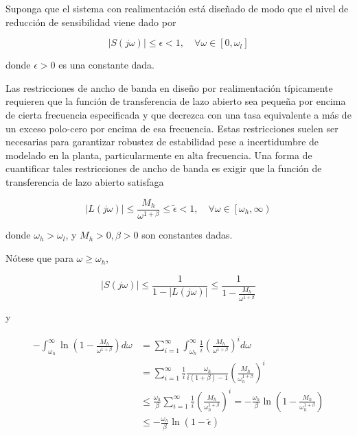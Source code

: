 
Suponga que el sistema con realimentación está diseñado de modo que el nivel de reducción de sensibilidad viene dado por

$$
|S(j \omega)| \leq \epsilon<1, \quad \forall \omega \in\left[0, \omega_{l}\right]
$$

donde $\epsilon>0$ es una constante dada.

Las restricciones de ancho de banda en diseño por realimentación típicamente requieren que la función de transferencia de lazo abierto sea pequeña por encima de cierta frecuencia especificada y que decrezca con una tasa equivalente a más de un exceso polo-cero por encima de esa frecuencia. Estas restricciones suelen ser necesarias para garantizar robustez de estabilidad pese a incertidumbre de modelado en la planta, particularmente en alta frecuencia. Una forma de cuantificar tales restricciones de ancho de banda es exigir que la función de transferencia de lazo abierto satisfaga

$$
|L(j \omega)| \leq \frac{M_{h}}{\omega^{1+\beta}} \leq \tilde{\epsilon}<1, \quad \forall \omega \in\left[\omega_{h}, \infty\right)
$$

donde $\omega_{h}>\omega_{l}$, y $M_{h}>0, \beta>0$ son constantes dadas.

Nótese que para $\omega \geq \omega_{h}$,

$$
|S(j \omega)| \leq \frac{1}{1-|L(j \omega)|} \leq \frac{1}{1-\frac{M_{h}}{\omega^{1+\beta}}}
$$

y

$$
\begin{aligned}
-\int_{\omega_{h}}^{\infty} \ln \left(1-\frac{M_{h}}{\omega^{1+\beta}}\right) d \omega & =\sum_{i=1}^{\infty} \int_{\omega_{h}}^{\infty} \frac{1}{i}\left(\frac{M_{h}}{\omega^{1+\beta}}\right)^{i} d \omega \\
& =\sum_{i=1}^{\infty} \frac{1}{i} \frac{\omega_{h}}{i(1+\beta)-1}\left(\frac{M_{h}}{\omega_{h}^{1+\beta}}\right)^{i} \\
& \leq \frac{\omega_{h}}{\beta} \sum_{i=1}^{\infty} \frac{1}{i}\left(\frac{M_{h}}{\omega_{h}^{1+\beta}}\right)^{i}=-\frac{\omega_{h}}{\beta} \ln \left(1-\frac{M_{h}}{\omega_{h}^{1+\beta}}\right) \\
& \leq-\frac{\omega_{h}}{\beta} \ln (1-\tilde{\epsilon})
\end{aligned}
$$

